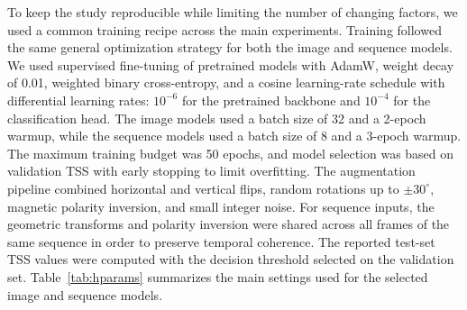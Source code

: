 \documentclass[runningheads]{llncs}
\begin{document}
To keep the study reproducible while limiting the number of changing factors, we used a common training recipe across the main experiments. Training followed the same general optimization strategy for both the image and sequence models. We used supervised fine-tuning of pretrained models with AdamW, weight decay of 0.01, weighted binary cross-entropy, and a cosine learning-rate schedule with differential learning rates: $10^{-6}$ for the pretrained backbone and $10^{-4}$ for the classification head. The image models used a batch size of 32 and a 2-epoch warmup, while the sequence models used a batch size of 8 and a 3-epoch warmup. The maximum training budget was 50 epochs, and model selection was based on validation TSS with early stopping to limit overfitting. The augmentation pipeline combined horizontal and vertical flips, random rotations up to $\pm 30^\circ$, magnetic polarity inversion, and small integer noise. For sequence inputs, the geometric transforms and polarity inversion were shared across all frames of the same sequence in order to preserve temporal coherence. The reported test-set TSS values were computed with the decision threshold selected on the validation set. Table~\ref{tab:hparams} summarizes the main settings used for the selected image and sequence models.


\end{document}

